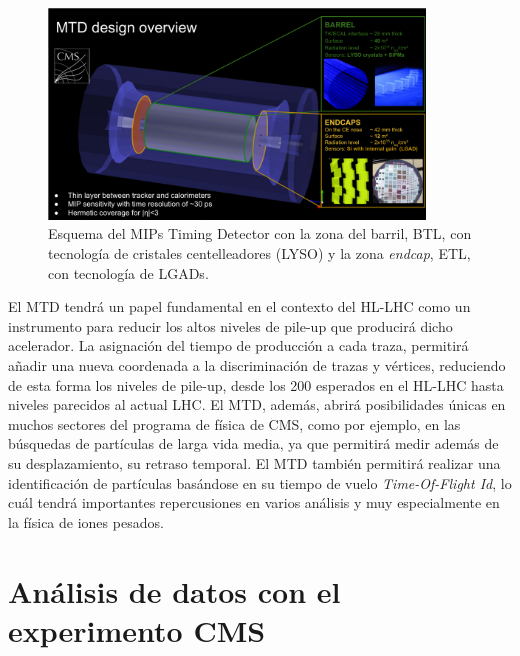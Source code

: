 \begin{figure}[ht]
\centering
\includegraphics[width=10cm]{fig/Timing_schematic_fancy.png}
\caption{Esquema del MIPs Timing Detector con la zona del barril, BTL, con tecnología de cristales centelleadores (LYSO) y la zona \emph{endcap}, ETL, con tecnología de LGADs.}
\label{fig:mtd}
\end{figure} 

El MTD tendrá un papel fundamental en el contexto del HL-LHC como un instrumento para reducir los altos niveles de pile-up que producirá dicho acelerador. La asignación del tiempo de producción a cada traza, permitirá añadir una nueva coordenada a la discriminación de trazas y vértices, reduciendo de esta forma los niveles de pile-up, desde los 200 esperados en el HL-LHC hasta niveles parecidos al actual LHC. El MTD, además, abrirá posibilidades únicas en muchos sectores del programa de física de CMS, como por ejemplo, en las búsquedas de partículas de larga vida media, ya que permitirá medir además de su desplazamiento, su retraso temporal. El MTD también permitirá realizar una identificación de partículas basándose en su tiempo de vuelo \emph{Time-Of-Flight Id}, lo cuál tendrá importantes repercusiones en varios análisis y muy especialmente en la física de iones pesados. 



\section{Análisis de datos con el experimento CMS}

